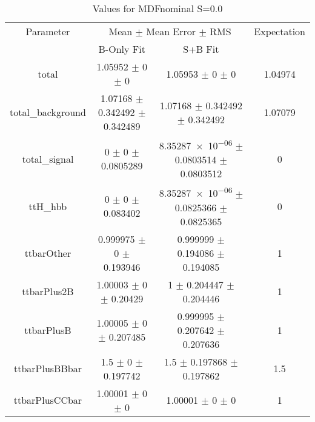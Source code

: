 \begin{table}
\centering
\caption{Values for MDFnominal S=0.0}
\begin{tabular}{cccc}
\toprule
Parameter & \multicolumn{2}{c}{Mean $\pm$ Mean Error $\pm$ RMS} & Expectation\\
 & B-Only Fit & S+B Fit & \\
\midrule
total & \num{1.05952} $\pm$ \num{0} $\pm$ \num{0} & \num{1.05953} $\pm$ \num{0} $\pm$ \num{0} & \num{1.04974}\\
total\_background & \num{1.07168} $\pm$ \num{0.342492} $\pm$ \num{0.342489} & \num{1.07168} $\pm$ \num{0.342492} $\pm$ \num{0.342492} & \num{1.07079}\\
total\_signal & \num{0} $\pm$ \num{0} $\pm$ \num{0.0805289} & \num{8.35287e-06} $\pm$ \num{0.0803514} $\pm$ \num{0.0803512} & \num{0}\\
ttH\_hbb & \num{0} $\pm$ \num{0} $\pm$ \num{0.083402} & \num{8.35287e-06} $\pm$ \num{0.0825366} $\pm$ \num{0.0825365} & \num{0}\\
ttbarOther & \num{0.999975} $\pm$ \num{0} $\pm$ \num{0.193946} & \num{0.999999} $\pm$ \num{0.194086} $\pm$ \num{0.194085} & \num{1}\\
ttbarPlus2B & \num{1.00003} $\pm$ \num{0} $\pm$ \num{0.20429} & \num{1} $\pm$ \num{0.204447} $\pm$ \num{0.204446} & \num{1}\\
ttbarPlusB & \num{1.00005} $\pm$ \num{0} $\pm$ \num{0.207485} & \num{0.999995} $\pm$ \num{0.207642} $\pm$ \num{0.207636} & \num{1}\\
ttbarPlusBBbar & \num{1.5} $\pm$ \num{0} $\pm$ \num{0.197742} & \num{1.5} $\pm$ \num{0.197868} $\pm$ \num{0.197862} & \num{1.5}\\
ttbarPlusCCbar & \num{1.00001} $\pm$ \num{0} $\pm$ \num{0} & \num{1.00001} $\pm$ \num{0} $\pm$ \num{0} & \num{1}\\
\bottomrule
\end{tabular}
\end{table}